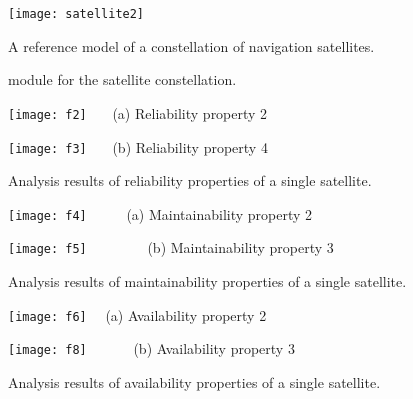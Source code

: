 \documentclass[preprint,12pt]{qrei}
\begin{document}
\begin{figure*}[ht]
\centerline{\texttt{[image: satellite2]}}
\caption{A reference model of a constellation of navigation satellites.}
\label{fig:model2}
\end{figure*}

\begin{figure}[ht]
\begin{center}
\setlength{\fboxrule}{0.5pt} 
\setlength{\fboxsep}{0.25cm} 
\caption{ module for the satellite constellation.}
\label{fig:code2}
\end{center}
\end{figure}

\begin{figure*}[ht]
\begin{minipage}[htbp]{0.5\linewidth}
\centering
\texttt{[image: f2]}
\footnotesize{\ \ \ (a) Reliability property 2}
\end{minipage}
\begin{minipage}[htbp]{0.5\linewidth}
\centering
\texttt{[image: f3]}
\footnotesize{\ \ \ (b) Reliability property 4}
\end{minipage}
\caption{Analysis results of reliability properties of a single satellite.}
\label{fig:one}
\end{figure*}

\begin{figure*}[ht]
\begin{minipage}[htbp]{0.5\linewidth}
\centering
\texttt{[image: f4]}
\footnotesize{\ \ \ \ \ (a) Maintainability property 2}
\end{minipage}
\begin{minipage}[htbp]{0.5\linewidth}
\centering
\texttt{[image: f5]}
\footnotesize{\ \ \ \ \ \ \ \ (b) Maintainability property 3}
\end{minipage}
\caption{Analysis results of maintainability properties of a single satellite.}
\label{fig:two}
\end{figure*}

\begin{figure*}[ht]
\begin{minipage}[htbp]{0.5\linewidth}
\centering
\texttt{[image: f6]}
\footnotesize{\ \ (a) Availability property 2}
\end{minipage}
\begin{minipage}[htbp]{0.5\linewidth}
\centering
\texttt{[image: f8]}
\footnotesize{\ \ \ \ \ \ (b) Availability property 3}
\end{minipage}
\caption{Analysis results of availability properties of a single satellite.}
\label{fig:three}
\end{figure*}
\end{document}
